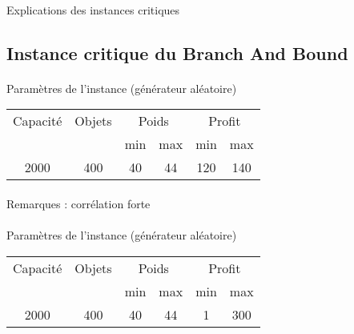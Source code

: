 \documentclass[12pt]{article}
\begin{document}
\paragraph{}Explications des instances critiques

\subsection{Instance critique du Branch And Bound}

\paragraph{}Paramètres de l'instance (générateur aléatoire)

\begin{tabular}{|c|c|c|c|c|c|}
\hline
Capacité & Objets & \multicolumn{2}{c|}{Poids} & \multicolumn{2}{c|}{Profit} \\
\cline{3-6}
& & min & max & min & max \\
\hline
2000 & 400 & 40 & 44 & 120 & 140 \\
\hline
\end{tabular}

\begin{figure}[!h]
\begin{floatrow}
\end{floatrow}
\end{figure}

\paragraph{}Remarques : corrélation forte

\paragraph{}Paramètres de l'instance (générateur aléatoire)

\begin{tabular}{|c|c|c|c|c|c|}
\hline
Capacité & Objets & \multicolumn{2}{c|}{Poids} & \multicolumn{2}{c|}{Profit} \\
\cline{3-6}
& & min & max & min & max \\
\hline
2000 & 400 & 40 & 44 & 1 & 300 \\
\hline
\end{tabular}
\end{document}
